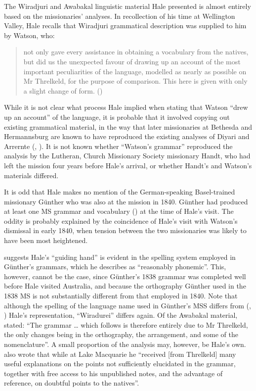 The Wiradjuri and Awabakal linguistic material Hale presented is almost entirely based on the missionaries' analyses. In recollection of his time at Wellington Valley, Hale recalls that Wiradjuri grammatical description was supplied to him by Watson, who: 

\begin{quote}
not only gave every assistance in obtaining a vocabulary from the natives, but did us the unexpected favour of drawing up an account of the most important peculiarities of the language, modelled as nearly as possible on Mr Threlkeld, for the purpose of comparison. This here is given with only a slight change of form. (\citealt[482]{hale_languages_1846})
\end{quote}

While it is not clear what process Hale implied when stating that Watson “drew up an account” of the language, it is probable that it involved copying out existing grammatical material, in the way that later missionaries at Bethesda and Hermannsburg are known to have reproduced the existing analyses of Diyari and Arrernte (, ). It is not known whether “Watson’s grammar” reproduced the analysis by the Lutheran, Church Missionary Society missionary Handt, who had left the mission four years before Hale’s arrival, or whether Handt’s and Watson’s materials differed.

It is odd that Hale makes no mention of the German-speaking Basel-trained missionary Günther who was also at the mission in 1840. Günther had produced at least one MS grammar and vocabulary (\citeyear{gunther_native_1838}) at the time of Hale’s visit. The oddity is probably explained by the coincidence of Hale’s visit with Watson’s dismissal in early 1840, when tension between the two missionaries was likely to have been most heightened. 

\citet[666]{capell_history_1970} suggests Hale’s “guiding hand” is evident in the spelling system employed in Günther’s grammars, which he describes as “reasonably phonemic”. This, however, cannot be the case, since Günther’s 1838 grammar was completed well before Hale visited Australia, and because the orthography Günther used in the 1838 MS is not substantially different from that employed in 1840. Note that although the spelling of the language name used in Günther’s MSS differs from (, ) Hale’s representation, “Wiradurei” differs again.
Of the Awabakal material, \citet[482]{hale_languages_1846} stated: “The grammar … which follows is therefore entirely due to Mr Threlkeld, the only changes being in the orthography, the arrangement, and some of the nomenclature”. A small proportion of the analysis may, however, be Hale’s own. \citet[482]{hale_languages_1846} also wrote that while at Lake Macquarie he “received [from Threlkeld] many useful explanations on the points not sufficiently elucidated in the grammar, together with free access to his unpublished notes, and the advantage of reference, on doubtful points to the natives”.


